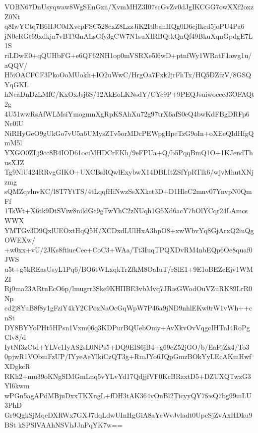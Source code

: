 VOBN67DnUsyqwaw8WgSEnGzn/XvmMHZ3I07scGvZv0dJgIKCGG7owXXf2oxzZ0Nt
q8IwYCtq7B6HJC0dXvepFSC528cxZ8LzzJiK2ItlbanHQg0D6cjIkcd5joPU4Pa6
jN0cRGt69xdkjn7vBT93nALsGfy3gCW7N1suXIRBQtkQnQf49BkuXqnGpdgE7L1S
riLDwE0+qQUHbFG+e6QF62NH1op0mVSRXe5l6wD+ptnfWy1WRatF1awg1u/aQQV/
H5iOACFCF3PkoOoMUokh+IO2uWwC/HrgOa7Fxk2jrFhTx/HQ5DZfzV/8GSQYqGKL
hNcaDnDzLMfC/KxOxJsj6S/12AkEoLKNsdY/CYc9P+9PEQJsuiwoeee33OFAQt2g
4U51wwRsAfWLMsiYmogmnXgRpKSAhXu72g97trX6afS0eQ4bwKdFBgDRFp6Ne0lU
NiRHyGeO9gUkGo7vU5a6UMysZTv5orMDcPEWpgHpeTzG9oIn+oXEeQIdHfgQmM5l
YXGO0ZLj9cc8B4IOD61ociMHDCrEKh/9eFPUa+Q/b5PqqBmQ1O+1KJendThusXJZ
Tg9NlU424RRvgGIKO+UXCBsRQwlExybwX14DBLItZSfYpRTlk6/wjvMhutXNjzmg
sQMZqvlnvKC/l8T7YtTS/4tLqqfHiNwzSsXXket3D+D1HleC2mnv07YnvpN0QmFf
1TsWt+X6tk9DtSViw8nildGc9gTwYhC2zNUqh1G5Xd6acY7bOlYCqr24LAmcsWWX
YMTGv3D9QxlUEOxtHqQ5H/XCDxdLUlHxA3hpO8+xwWbvYq8GjArxQ2iuQgOWEXw/
+w0xx+vU/2JKs8ftiueCee+CoC3+WAa/Tt3IuqTPQXDvRM4nbEQp6Oe8quaf0JWS
u5t+g5kREasUsyL1Pq6/BO6tWLxqkTrZfkM8OaIuT/rSlE1+9E1oBEZeEjv1WMZI
Rj0ma23ARtnEcO6p/lmugrr3Ske9KHIIBE3vbMvq7JRisGWodOuVZuRK89LrR0Np
cd2j8YuB8f8y1gFziY4kY2CPoxNaOcGqWpW7P46a9jND9nhlEKw0rW1vWh++cnSt
DY8BYYoPHt5HPsn1Vxm06q3KDPurBQUebOmy+AvXkvOvVqgcIHTnI4RoPgClv8/d
IytNf3zCtd+YLVc1IyAS2sL0NPs5+DQ9EIS6jB4+g69cZ52jGO/b/EaFjZx4/To3
0pjwR1VObmFzUP/IYyeAeYlkiCzQT3g+RmJYo6JQpGmzBOkYyLEcAKmHwfXDgkcR
RKh2+mu39oKNgSIMGmLnq5vYLvYd17QdjjfVF0KcBRzxtD5+DZUXQTwzG3Yl6kwm
wPGn5agAPdMBjuDxxTKXngL+fDH3tAK364vOnBl2TicyyQY7fcsQ7bg99mLU3PhD
Gr9QgkSjMqeDXRWx7GXJ7dqLdwUInHgGiA8aYcWvJvladt0UpcSjZvAxHDku9BSt
kSPSlVAAhNSVhJJnPqYK7w==
